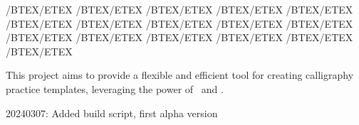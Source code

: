 /BTEX\NormalTok{[}/ETEX
/BTEX/ETEX
/BTEX/ETEX
/BTEX/ETEX
/BTEX/ETEX
/BTEX/ETEX
/BTEX/ETEX
/BTEX/ETEX
/BTEX/ETEX
/BTEX/ETEX
/BTEX/ETEX
/BTEX/ETEX
/BTEX/ETEX
/BTEX/ETEX
/BTEX\NormalTok{]}/ETEX
/BTEX/ETEX
\stophighlighting

This project aims to provide a flexible and efficient tool for creating calligraphy practice templates, leveraging the power of \CONTEXT~and \METAPOST.

\stopsubsubsection

\stopsubsection

\startsubsection[title={Changelog},reference={changelog}]

\startitemize[packed]
\item
  20240307: Added build script, first alpha version
\stopitemize

\stopsubsection

\stopsection
